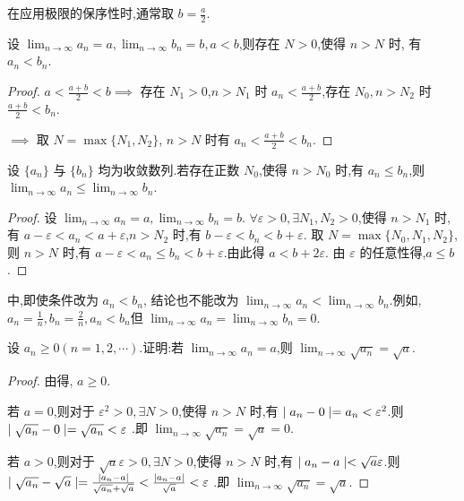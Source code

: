 \begin{annotation}
    在应用极限的保序性时,通常取 $b=\frac{a}{2}$.
\end{annotation}

\begin{conclusion}
    设 $\lim_{n\to\infty} a_n=a,\lim_{n\to\infty} b_n=b,a<b$,则存在 $N>0$,使得 $n>N$ 时, 有 $a_n<b_n$.
\end{conclusion}

\begin{proof}
    $a<\frac{a+b}{2}<b\implies $ 存在 $N_1>0$,$n>N_1$ 时 $a_n<\frac{a+b}{2}$,存在 $N_0,n>N_2$ 时 $\frac{a+b}{2}<b_n$.

    $\implies$ 取 $N=\max \{N_1,N_2\}$, $n>N$ 时有 $a_n<\frac{a+b}{2}<b_n$.
\end{proof}
 
\begin{theorem}[极限的保序性2]\label{thm:xu2}
    设 $\{a_n\}$ 与 $\{b_n\}$ 均为收敛数列.若存在正数 $N_0$,使得 $n>N_0$ 时,有 $a_n\le b_n$,则 $\lim_{n\to\infty} a_n\le \lim_{n\to\infty} b_n$.
\end{theorem}

\begin{proof}
    设 $\lim_{n\to\infty} a_n=a,\lim_{n\to\infty} b_n=b$. $\forall \varepsilon>0,\exists N_1,N_2>0$,使得 $ n>N_1$ 时,有 $a-\varepsilon<a_n<a+\varepsilon$,$ n>N_2$ 时,有 $b-\varepsilon<b_n<b+\varepsilon$. 取 $N=\max\{N_0,N_1,N_2\}$,则 $n>N$ 时,有 $a-\varepsilon<a_n\le b_n<b+\varepsilon$.由此得 $a<b+2\varepsilon$. 由 $\varepsilon$ 的任意性得,$a\le b$. 
\end{proof}

\begin{annotation}
    中,即使条件改为 $a_n<b_n$, 结论也不能改为 $\lim_{n\to\infty} a_n< \lim_{n\to\infty} b_n$.例如,$a_n=\frac{1}{n},b_n=\frac{2}{n},a_n< b_n$但 $\lim_{n\to\infty} a_n= \lim_{n\to\infty} b_n=0$.
\end{annotation}

\begin{example}
    设 $a_n\ge 0(n=1,2,\cdots)$.证明:若 $\lim_{n\to\infty} a_n=a$,则 $\lim_{n\to\infty} \sqrt{a_n}=\sqrt{a}$.
\end{example}

\begin{proof}
    由得, $a\ge 0$.

    若 $a=0$,则对于 $\varepsilon^2>0,\exists N>0$,使得 $ n>N$ 时,有 $\mid a_n-0 \mid=a_n<\varepsilon^2$.则 $\mid \sqrt{a_n}-0 \mid=\sqrt{a_n}<\varepsilon$ .即 $\lim_{n\to\infty} \sqrt{a_n}=\sqrt{a}=0$.

    若 $a>0$,则对于 $
    \sqrt{a}\varepsilon>0,\exists N>0$,使得 $ n>N$ 时,有 $\mid a_n-a \mid<\sqrt{a}\varepsilon$.则 $\mid \sqrt{a_n}-\sqrt{a} \mid=\frac{\mid a_n-a \mid}{\sqrt{a_n}+\sqrt{a}}<\frac{\mid a_n-a \mid}{\sqrt{a}}<\varepsilon$ .即 $\lim_{n\to\infty} \sqrt{a_n}=\sqrt{a}$.
\end{proof}

